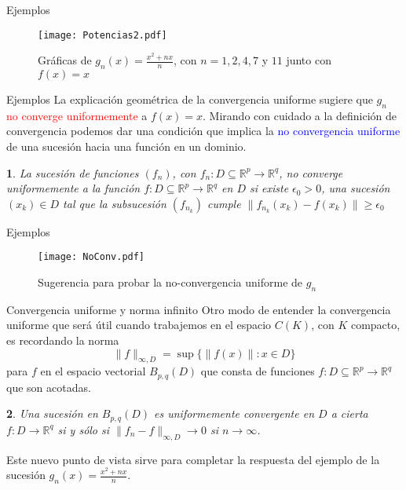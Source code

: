 \documentclass[xcolor=dvipsnames,10pt,handout, draft]{beamer}
\newcommand{\rzp}{\mathbb R^{p}}
\newcommand{\rzq}{\mathbb R^{q}}
\newtheorem*{afirma}{}
\begin{document}
\begin{frame}{Ejemplos}
\begin{figure}
\texttt{[image: Potencias2.pdf]}
\caption{Gr\'aficas de $\displaystyle g_n(x)=\frac{x^2+nx}{n}$, con $n=1,2, 4, 7$  y $11$ junto con $f(x)=x$}
\end{figure}
\end{frame}


\begin{frame}{Ejemplos}
La explicaci\'on geom\'etrica de la convergencia uniforme sugiere que $g_n$ \textcolor{red}{no converge uniformemente} a $f(x)=x$.
\pause\vskip4pt
Mirando con cuidado a la definici\'on de convergencia podemos dar una condici\'on que implica la \textcolor{blue}{no convergencia uniforme} de una sucesi\'on hacia una funci\'on en un dominio.\pause
\begin{afirma}
La sucesi\'on de funciones $(f_n)$, con $f_n:D\subseteq\rzp\to\rzq$, no converge uniformemente a la funci\'on $f:D\subseteq\rzp\to\rzq$ en $D$ si existe $\epsilon_0>0$, una sucesi\'on $(x_k) \in D$ tal que la subsucesi\'on $(f_{n_k})$ cumple $\|f_{n_k}(x_k)-f(x_k)\|\geq\epsilon_0$
\end{afirma}
\end{frame}


\begin{frame}{Ejemplos}
\begin{figure}
\texttt{[image: NoConv.pdf]}
\caption{Sugerencia para probar la no-convergencia uniforme de $g_n$}
\end{figure}
\end{frame}

\begin{frame}{Convergencia uniforme y norma infinito}
Otro modo de entender la convergencia uniforme que ser\'a \'util cuando trabajemos en el espacio $C(K)$, con $K$ compacto, es recordando la norma 
$$\|f\|_{\infty,D}=\sup\big\{\|f(x)\|:x\in D\big\}$$
para $f$ en el espacio vectorial $B_{p,q}(D)$ que consta de funciones $f:D\subseteq\rzp\to\rzq$ que son acotadas.\pause
\begin{afirma}
Una sucesi\'on en $B_{p,q}(D)$ es uniformemente convergente en $D$ a cierta $f:D\to\rzq$ si y s\'olo si $\|f_n-f\|_{\infty,D}\to0$ si $n\to\infty$.
\end{afirma}\pause
Este nuevo punto de vista sirve para completar la respuesta del ejemplo de la sucesi\'on  $\displaystyle g_n(x)=\frac{x^2+nx}{n}$.
\end{frame}
\end{document}

